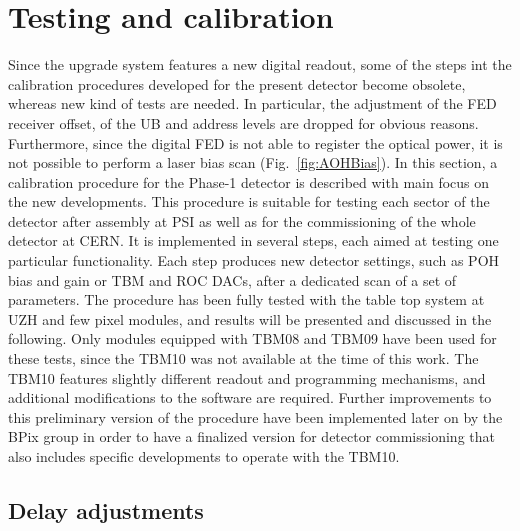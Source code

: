 \section{Testing and calibration}\label{sec:Phase1Calib}

Since the upgrade system features a new digital readout, some of the steps int the calibration procedures developed for the present detector become obsolete, whereas new kind of tests are needed.
In particular, the adjustment of the FED receiver offset, of the UB and address levels are dropped for obvious reasons.
Furthermore, since the digital FED is not able to register the optical power, it is not possible to perform a laser bias scan (Fig.~\ref{fig:AOHBias}).
In this section, a calibration procedure for the Phase-1 detector is described with main focus on the new developments.
This procedure is suitable for testing each sector of the detector after assembly at PSI as well as for the commissioning of the whole detector at CERN.
It is implemented in several steps, each aimed at testing one particular functionality. 
Each step produces new detector settings, such as POH bias and gain or TBM and ROC DACs, after a dedicated scan of a set of parameters.
The procedure has been fully tested with the table top system at UZH and few pixel modules, and results will be presented and discussed in the following.
Only modules equipped with TBM08 and TBM09 have been used for these tests,
since the TBM10 was not available at the time of this work.
The TBM10 features slightly different readout and programming mechanisms, and additional modifications to the software are required.
Further improvements to this preliminary version of the procedure have been implemented later on by the BPix group in order to have a finalized version for detector commissioning
that also includes specific developments to operate with the TBM10.

\subsection{Delay adjustments}\label{subsec:TBMPLLROCDelays}

